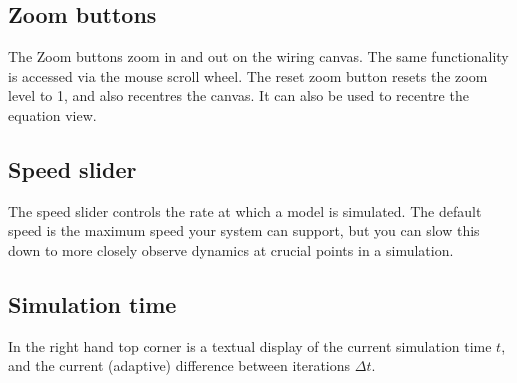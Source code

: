 %
%
%
%
%
%
%

\subsection{Zoom buttons}
\label{ZoomButtons}

\begin{center}
\end{center}

The Zoom buttons zoom in and out on the wiring canvas. The same functionality
is accessed via the mouse scroll wheel. The reset zoom button
 resets the zoom level to 1, and also
recentres the canvas. It can also be used to recentre the equation view.

\subsection{Speed slider}
\label{Speedslider}

\begin{center}
\end{center}

The speed slider controls the rate at which a model is simulated. The
default speed is the maximum speed your system can support, but you
can slow this down to more closely observe dynamics at crucial points
in a simulation.

\subsection{Simulation time}
\label{SimTime}

In the right hand top corner is a textual display of the current
simulation time $t$, and the current (adaptive) difference between
iterations $\Delta t$.


